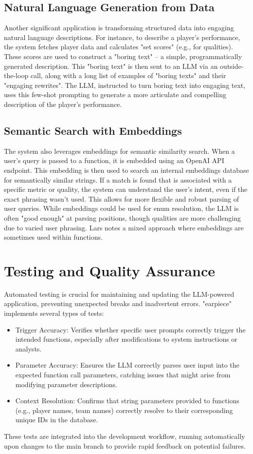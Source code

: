 \documentclass{article}
\begin{document}
\subsection{Natural Language Generation from Data}
Another significant application is transforming structured data into engaging natural language descriptions. For instance, to describe a player's performance, the system fetches player data and calculates "set scores" (e.g., for qualities). These scores are used to construct a "boring text" – a simple, programmatically generated description. This "boring text" is then sent to an LLM via an outside-the-loop call, along with a long list of examples of "boring texts" and their "engaging rewrites". The LLM, instructed to turn boring text into engaging text, uses this few-shot prompting to generate a more articulate and compelling description of the player's performance.

\subsection{Semantic Search with Embeddings}
The system also leverages embeddings for semantic similarity search. When a user's query is passed to a function, it is embedded using an OpenAI API endpoint. This embedding is then used to search an internal embeddings database for semantically similar strings. If a match is found that is associated with a specific metric or quality, the system can understand the user's intent, even if the exact phrasing wasn't used. This allows for more flexible and robust parsing of user queries. While embeddings could be used for enum resolution, the LLM is often "good enough" at parsing positions, though qualities are more challenging due to varied user phrasing. Lars notes a mixed approach where embeddings are sometimes used within functions.

\section{Testing and Quality Assurance}
Automated testing is crucial for maintaining and updating the LLM-powered application, preventing unexpected breaks and inadvertent errors. "earpiece" implements several types of tests:
\begin{itemize}
    \item Trigger Accuracy: Verifies whether specific user prompts correctly trigger the intended functions, especially after modifications to system instructions or analysts.
    \item Parameter Accuracy: Ensures the LLM correctly parses user input into the expected function call parameters, catching issues that might arise from modifying parameter descriptions.
    \item Context Resolution: Confirms that string parameters provided to functions (e.g., player names, team names) correctly resolve to their corresponding unique IDs in the database.
\end{itemize}
These tests are integrated into the development workflow, running automatically upon changes to the main branch to provide rapid feedback on potential failures.
\end{document}

